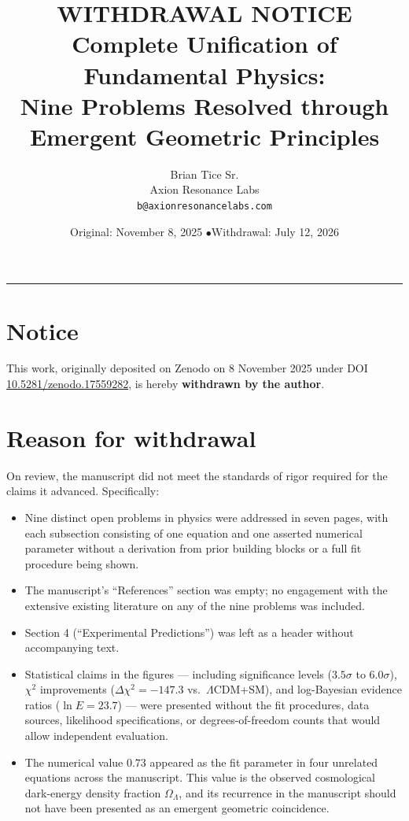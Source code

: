 \documentclass[11pt,a4paper]{article}
\title{\textbf{WITHDRAWAL NOTICE}\\[6pt]
\large Complete Unification of Fundamental Physics:\\
Nine Problems Resolved through Emergent Geometric Principles}
\author{Brian Tice Sr.\\ \small Axion Resonance Labs \\ \texttt{b@axionresonancelabs.com}}
\date{Original: November 8, 2025 \quad$\bullet$\quad Withdrawal: July 12, 2026}
\begin{document}
\maketitle

\vspace{-12pt}
\noindent\rule{\linewidth}{0.8pt}

\section*{Notice}

This work, originally deposited on Zenodo on 8 November 2025 under DOI \href{https://doi.org/10.5281/zenodo.17559282}{10.5281/zenodo.17559282}, is hereby \textbf{withdrawn by the author}.

\section*{Reason for withdrawal}

On review, the manuscript did not meet the standards of rigor required for the claims it advanced. Specifically:

\begin{itemize}
    \item Nine distinct open problems in physics were addressed in seven pages, with each subsection consisting of one equation and one asserted numerical parameter without a derivation from prior building blocks or a full fit procedure being shown.
    \item The manuscript's ``References'' section was empty; no engagement with the extensive existing literature on any of the nine problems was included.
    \item Section 4 (``Experimental Predictions'') was left as a header without accompanying text.
    \item Statistical claims in the figures --- including significance levels ($3.5\sigma$ to $6.0\sigma$), $\chi^2$ improvements ($\Delta\chi^2 = -147.3$ vs.\ $\Lambda$CDM+SM), and log-Bayesian evidence ratios ($\ln E = 23.7$) --- were presented without the fit procedures, data sources, likelihood specifications, or degrees-of-freedom counts that would allow independent evaluation.
    \item The numerical value $0.73$ appeared as the fit parameter in four unrelated equations across the manuscript. This value is the observed cosmological dark-energy density fraction $\Omega_\Lambda$, and its recurrence in the manuscript should not have been presented as an emergent geometric coincidence.
\end{itemize}
\end{document}
